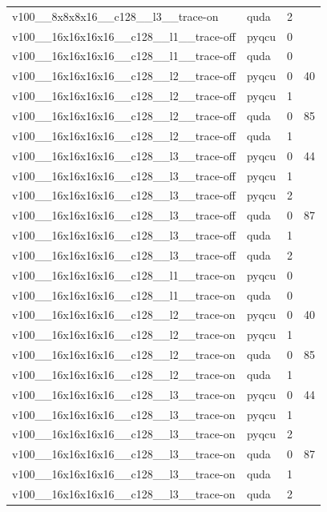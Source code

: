 \begin{table}[htbp]
\begin{tabular}{@{}llrr@{}}
v100\_\_8x8x8x16\_\_c128\_\_l3\_\_trace-on & quda & 2 &  \\
v100\_\_16x16x16x16\_\_c128\_\_l1\_\_trace-off & pyqcu & 0 &  \\
v100\_\_16x16x16x16\_\_c128\_\_l1\_\_trace-off & quda & 0 &  \\
v100\_\_16x16x16x16\_\_c128\_\_l2\_\_trace-off & pyqcu & 0 & 40 \\
v100\_\_16x16x16x16\_\_c128\_\_l2\_\_trace-off & pyqcu & 1 &  \\
v100\_\_16x16x16x16\_\_c128\_\_l2\_\_trace-off & quda & 0 & 85 \\
v100\_\_16x16x16x16\_\_c128\_\_l2\_\_trace-off & quda & 1 &  \\
v100\_\_16x16x16x16\_\_c128\_\_l3\_\_trace-off & pyqcu & 0 & 44 \\
v100\_\_16x16x16x16\_\_c128\_\_l3\_\_trace-off & pyqcu & 1 &  \\
v100\_\_16x16x16x16\_\_c128\_\_l3\_\_trace-off & pyqcu & 2 &  \\
v100\_\_16x16x16x16\_\_c128\_\_l3\_\_trace-off & quda & 0 & 87 \\
v100\_\_16x16x16x16\_\_c128\_\_l3\_\_trace-off & quda & 1 &  \\
v100\_\_16x16x16x16\_\_c128\_\_l3\_\_trace-off & quda & 2 &  \\
v100\_\_16x16x16x16\_\_c128\_\_l1\_\_trace-on & pyqcu & 0 &  \\
v100\_\_16x16x16x16\_\_c128\_\_l1\_\_trace-on & quda & 0 &  \\
v100\_\_16x16x16x16\_\_c128\_\_l2\_\_trace-on & pyqcu & 0 & 40 \\
v100\_\_16x16x16x16\_\_c128\_\_l2\_\_trace-on & pyqcu & 1 &  \\
v100\_\_16x16x16x16\_\_c128\_\_l2\_\_trace-on & quda & 0 & 85 \\
v100\_\_16x16x16x16\_\_c128\_\_l2\_\_trace-on & quda & 1 &  \\
v100\_\_16x16x16x16\_\_c128\_\_l3\_\_trace-on & pyqcu & 0 & 44 \\
v100\_\_16x16x16x16\_\_c128\_\_l3\_\_trace-on & pyqcu & 1 &  \\
v100\_\_16x16x16x16\_\_c128\_\_l3\_\_trace-on & pyqcu & 2 &  \\
v100\_\_16x16x16x16\_\_c128\_\_l3\_\_trace-on & quda & 0 & 87 \\
v100\_\_16x16x16x16\_\_c128\_\_l3\_\_trace-on & quda & 1 &  \\
v100\_\_16x16x16x16\_\_c128\_\_l3\_\_trace-on & quda & 2 &  \\

\end{tabular}
\end{table}
